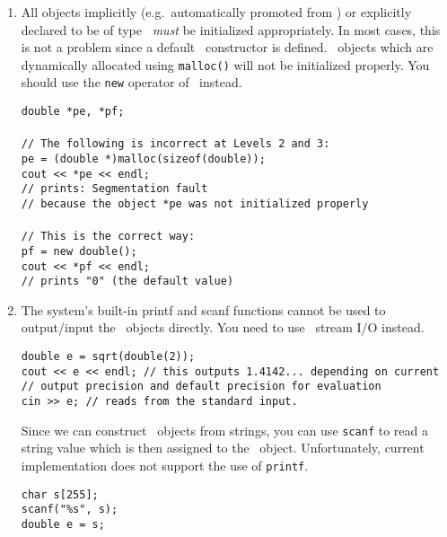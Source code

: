\documentclass[12pt]{article}
\begin{document}
\begin{enumerate}
\item
All objects implicitly (e.g.\  automatically promoted from \double) or
explicitly declared to be of type \expr\ {\em must} be initialized appropriately.
In most cases, this is not a problem since a default \expr\ constructor is 
defined.  \expr\ objects which are dynamically allocated 
using {\tt malloc()} will not be initialized properly.  You should 
use the {\tt new} operator of \cpp\ instead.\\

\begin{progb} {
\> \tt double *pe, *pf;\\
\> \\
\> \tt // The following is incorrect at Levels 2 and 3:\\
\> \tt pe = (double *)malloc(sizeof(double));\\
\> \tt cout << *pe << endl;\\
\> \tt // prints: Segmentation fault\\
\> \tt // because the object *pe was not initialized properly \\
\> \\
\> \tt // This is the correct way:\\
\> \tt pf = new double();\\
\> \tt cout << *pf << endl;\\
\> \tt // prints "0" (the default value)
}\end{progb}

\item
The system's built-in printf and scanf functions cannot be used to 
output/input the \expr\ objects directly. You need to use \cpp\ stream I/O
instead.

\begin{progb}{
\> \tt double e = sqrt(double(2)); \\
\> \tt cout << e << endl; // this outputs 1.4142... depending on current \\
\>\>\>\tt         // output precision and default precision for evaluation \\
\> \tt cin >> e;      // reads from the standard input. 
}\end{progb}

Since we can construct \expr\ objects from strings, you can use
\texttt{scanf} to read a string value which is then assigned to
the \expr\ object.
Unfortunately, current implementation does not support the
use of \texttt{printf}.

\begin{progb}{
\> \tt char s[255]; \\
\> \tt scanf("\%s", s); \\
\> \tt double e = s; 
}\end{progb}


\end{enumerate}
\end{document}
